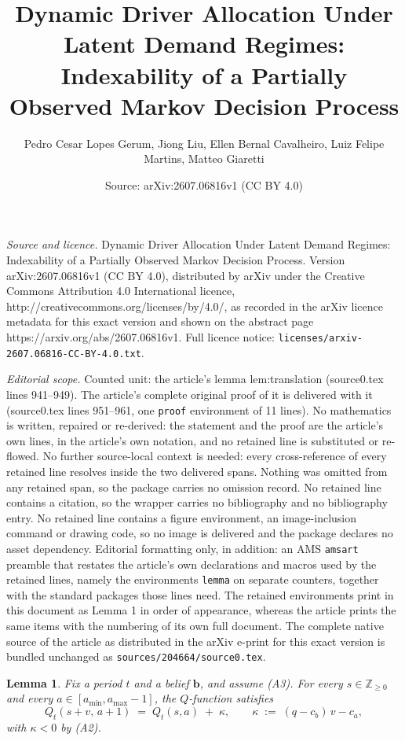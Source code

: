 \documentclass[10pt,a4paper]{amsart}
\title{Dynamic Driver Allocation Under Latent Demand Regimes: Indexability of a Partially Observed Markov Decision Process}
\author{Pedro Cesar Lopes Gerum, Jiong Liu, Ellen Bernal Cavalheiro, Luiz Felipe Martins, Matteo Giaretti}
\date{Source: arXiv:2607.06816v1 (CC BY 4.0)}
\newtheorem{lemma}{Lemma}
\newcommand{\bvec}[1]{\mathbf{#1}}
\begin{document}
\maketitle

\noindent\emph{Source and licence.} Dynamic Driver Allocation Under Latent Demand Regimes: Indexability of a Partially Observed Markov Decision Process. Version arXiv:2607.06816v1 (CC BY 4.0), distributed by arXiv under the Creative Commons Attribution 4.0 International licence, http://creativecommons.org/licenses/by/4.0/, as recorded in the arXiv licence metadata for this exact version and shown on the abstract page https://arxiv.org/abs/2607.06816v1. Full licence notice: \texttt{licenses/arxiv-2607.06816-CC-BY-4.0.txt}.\par\smallskip

\noindent\textit{Editorial scope.} Counted unit: the article's lemma lem:translation (source0.tex lines 941--949). The article's complete original proof of it is delivered with it (source0.tex lines 951--961, one \texttt{proof} environment of 11 lines). No mathematics is written, repaired or re-derived: the statement and the proof are the article's own lines, in the article's own notation, and no retained line is substituted or re-flowed.  No further source-local context is needed: every cross-reference of every retained line resolves inside the two delivered spans.  Nothing was omitted from any retained span, so the package carries no omission record.  No retained line contains a citation, so the wrapper carries no bibliography and no bibliography entry.  No retained line contains a figure environment, an image-inclusion command or drawing code, so no image is delivered and the package declares no asset dependency.  Editorial formatting only, in addition: an AMS \texttt{amsart} preamble that restates the article's own declarations and macros used by the retained lines, namely the environments \texttt{lemma} on separate counters, together with the standard packages those lines need.  The retained environments print in this document as Lemma 1 in order of appearance, whereas the article prints the same items with the numbering of its own full document.  The complete native source of the article as distributed in the arXiv e-print for this exact version is bundled unchanged as \texttt{sources/204664/source0.tex}.
\begin{lemma}
\label{lem:translation}
Fix a period $t$ and a belief $\bvec{b}$, and assume (A3). For every $s \in \mathbb{Z}_{\ge 0}$ and every $a \in [a_{\min}, a_{\max}-1]$, the $Q$-function satisfies
\begin{equation}
Q_t(s+v,\,a+1) \;=\; Q_t(s,a) \;+\; \kappa, \qquad \kappa \;:=\; (q-c_b)\,v - c_a,
\label{eq:translation}
\end{equation}
with $\kappa < 0$ by (A2).
\end{lemma}
\end{document}
